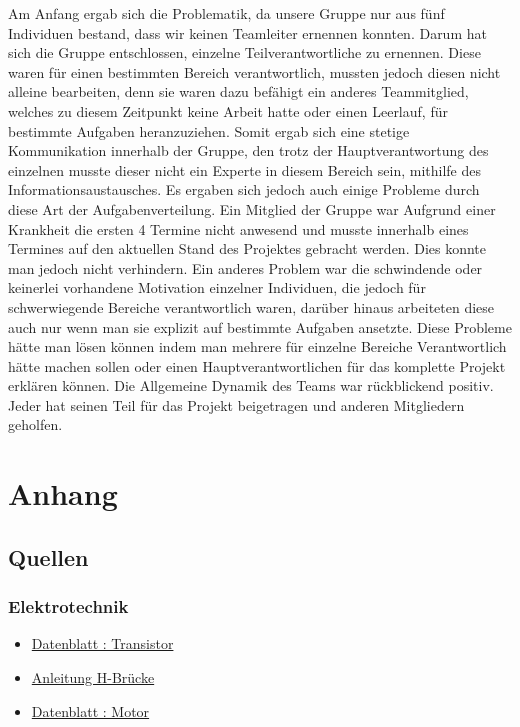 \documentclass{report}
\begin{document}
Am Anfang ergab sich die Problematik, da unsere Gruppe nur aus fünf Individuen bestand, dass wir keinen Teamleiter ernennen konnten. Darum hat sich die Gruppe entschlossen, einzelne Teilverantwortliche zu ernennen. Diese waren für einen bestimmten Bereich verantwortlich, mussten jedoch diesen nicht alleine bearbeiten, denn sie waren dazu befähigt ein anderes Teammitglied, welches zu diesem Zeitpunkt keine Arbeit hatte oder einen Leerlauf, für bestimmte Aufgaben heranzuziehen.
Somit ergab sich eine stetige Kommunikation innerhalb der Gruppe, den trotz der Hauptverantwortung des einzelnen musste dieser nicht ein Experte in diesem Bereich sein, mithilfe des Informationsaustausches.
Es ergaben sich jedoch auch einige Probleme durch diese Art der Aufgabenverteilung. Ein Mitglied der Gruppe war Aufgrund einer Krankheit die ersten 4 Termine nicht anwesend und musste innerhalb eines Termines auf den aktuellen Stand des Projektes gebracht werden. Dies konnte man jedoch nicht verhindern. Ein anderes Problem war die schwindende oder keinerlei vorhandene Motivation einzelner Individuen, die jedoch für schwerwiegende Bereiche verantwortlich waren, darüber hinaus arbeiteten diese auch nur wenn man sie explizit auf bestimmte Aufgaben ansetzte. 
Diese Probleme hätte man lösen können indem man mehrere für einzelne Bereiche Verantwortlich hätte machen sollen oder einen Hauptverantwortlichen für das komplette Projekt erklären können.
Die Allgemeine Dynamik des Teams war rückblickend positiv. Jeder hat seinen Teil für das Projekt beigetragen und anderen Mitgliedern geholfen.


\chapter{Anhang}


\section{Quellen}

\subsection{Elektrotechnik}
\begin{itemize}

\item \href{http://cdn-reichelt.de/documents/datenblatt/A100/BC546_48-CDIL.pdf}{Datenblatt : Transistor}


\item \href{http://anleitung.joy-it.net/wp-content/uploads/2017/06/SBC-MotoDriver2-Anleitung.pdf}{Anleitung H-Brücke}

\item \href{http://cdn-reichelt.de/documents/datenblatt/A300/COM_MOTOR_RAD_DB-DE.pdf}{Datenblatt : Motor}

\end{itemize}
\end{document}
